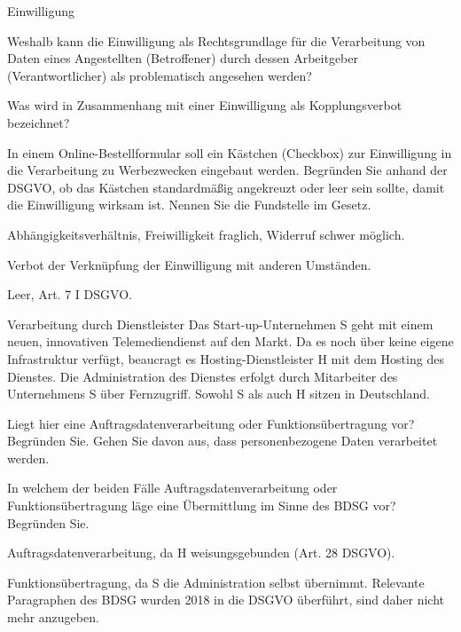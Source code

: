 \documentclass{exercisesheet}
\begin{document}
\begin{exercises}{Einwilligung}
\item Weshalb kann die Einwilligung als Rechtsgrundlage für die Verarbeitung von Daten eines Angestellten (Betroffener) durch dessen Arbeitgeber (Verantwortlicher) als problematisch angesehen werden?
\item Was wird in Zusammenhang mit einer Einwilligung als Kopplungsverbot bezeichnet?
\item In einem Online-Bestellformular soll ein Kästchen (Checkbox) zur Einwilligung in die Verarbeitung zu Werbezwecken eingebaut werden. Begründen Sie anhand der DSGVO, ob das Kästchen standardmäßig angekreuzt oder leer sein sollte, damit die Einwilligung wirksam ist. Nennen Sie die Fundstelle im Gesetz.
\end{exercises}

\begin{solutions}
  \item Abhängigkeitsverhältnis, Freiwilligkeit fraglich, Widerruf schwer möglich.
  \item Verbot der Verknüpfung der Einwilligung mit anderen Umständen.
  \item Leer, Art. 7 I DSGVO.
\end{solutions}

\begin{eexercises}{Verarbeitung durch Dienstleister}{
    Das Start-up-Unternehmen S geht mit einem neuen, innovativen Telemediendienst auf den Markt. Da es noch über keine eigene Infrastruktur verfügt, beaucragt es Hosting-Dienstleister H mit dem Hosting des Dienstes. Die Administration des Dienstes erfolgt durch Mitarbeiter des Unternehmens S über Fernzugriff. Sowohl S als auch H sitzen in Deutschland.
  }
  \item Liegt hier eine Auftragsdatenverarbeitung oder Funktionsübertragung vor? Begründen Sie. Gehen Sie davon aus, dass personenbezogene Daten verarbeitet werden.
  \item In welchem der beiden Fälle Auftragsdatenverarbeitung oder Funktionsübertragung läge eine Übermittlung im Sinne des BDSG vor? Begründen Sie.
\end{eexercises}

\begin{solutions}
  \item Auftragsdatenverarbeitung, da H weisungsgebunden (Art. 28 DSGVO).
  \item Funktionsübertragung, da S die Administration selbst übernimmt. Relevante Paragraphen des BDSG wurden 2018 in die DSGVO überführt, sind daher nicht mehr anzugeben.
\end{solutions}
\end{document}
